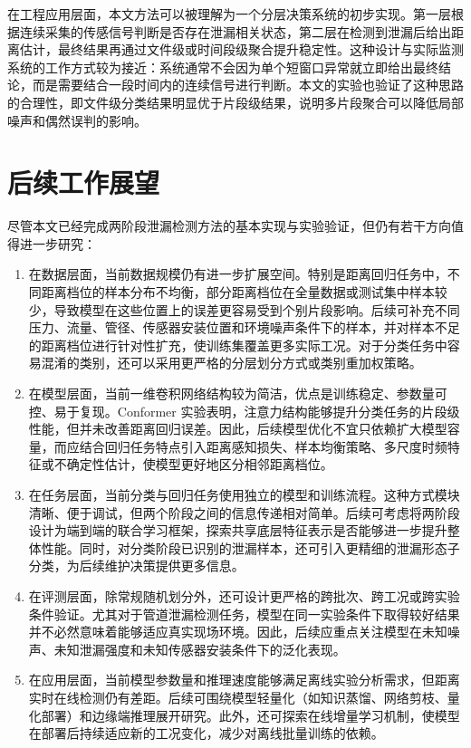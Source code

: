 在工程应用层面，本文方法可以被理解为一个分层决策系统的初步实现。第一层根据连续采集的传感信号判断是否存在泄漏相关状态，第二层在检测到泄漏后给出距离估计，最终结果再通过文件级或时间段级聚合提升稳定性。这种设计与实际监测系统的工作方式较为接近：系统通常不会因为单个短窗口异常就立即给出最终结论，而是需要结合一段时间内的连续信号进行判断。本文的实验也验证了这种思路的合理性，即文件级分类结果明显优于片段级结果，说明多片段聚合可以降低局部噪声和偶然误判的影响。

\section{后续工作展望}

尽管本文已经完成两阶段泄漏检测方法的基本实现与实验验证，但仍有若干方向值得进一步研究：

\begin{enumerate}
  \item 在数据层面，当前数据规模仍有进一步扩展空间。特别是距离回归任务中，不同距离档位的样本分布不均衡，部分距离档位在全量数据或测试集中样本较少，导致模型在这些位置上的误差更容易受到个别片段影响。后续可补充不同压力、流量、管径、传感器安装位置和环境噪声条件下的样本，并对样本不足的距离档位进行针对性扩充，使训练集覆盖更多实际工况。对于分类任务中容易混淆的类别，还可以采用更严格的分层划分方式或类别重加权策略。
  \item 在模型层面，当前一维卷积网络结构较为简洁，优点是训练稳定、参数量可控、易于复现。Conformer 实验表明，注意力结构能够提升分类任务的片段级性能，但并未改善距离回归误差。因此，后续模型优化不宜只依赖扩大模型容量，而应结合回归任务特点引入距离感知损失、样本均衡策略、多尺度时频特征或不确定性估计，使模型更好地区分相邻距离档位。
  \item 在任务层面，当前分类与回归任务使用独立的模型和训练流程。这种方式模块清晰、便于调试，但两个阶段之间的信息传递相对简单。后续可考虑将两阶段设计为端到端的联合学习框架，探索共享底层特征表示是否能够进一步提升整体性能。同时，对分类阶段已识别的泄漏样本，还可引入更精细的泄漏形态子分类，为后续维护决策提供更多信息。
  \item 在评测层面，除常规随机划分外，还可设计更严格的跨批次、跨工况或跨实验条件验证。尤其对于管道泄漏检测任务，模型在同一实验条件下取得较好结果并不必然意味着能够适应真实现场环境。因此，后续应重点关注模型在未知噪声、未知泄漏强度和未知传感器安装条件下的泛化表现。
  \item 在应用层面，当前模型参数量和推理速度能够满足离线实验分析需求，但距离实时在线检测仍有差距。后续可围绕模型轻量化（如知识蒸馏、网络剪枝、量化部署）和边缘端推理展开研究。此外，还可探索在线增量学习机制，使模型在部署后持续适应新的工况变化，减少对离线批量训练的依赖。

\end{enumerate}
